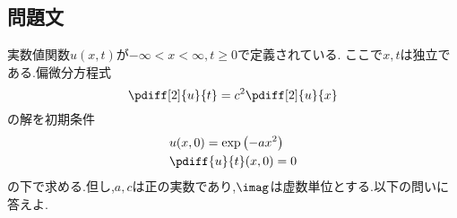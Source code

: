 \documentclass[dvipdfmx,titlepage, 11pt, a4paper]{jsarticle}%
\begin{document}
\newpage

\section{}%
\subsection{問題文}
実数値関数$u(x, t)$が$-\infty < x < \infty, t \geq 0$で定義されている.
ここで$x, t$は独立である.偏微分方程式
\begin{equation}
    \pdiff[2]{u}{t} = c^{2}\pdiff[2]{u}{x}\label{eq:subsec2:prom2}
\end{equation}
の解を初期条件
\begin{align}
    & u(x, 0) = \exp\left(-ax^{2}\right)\label{eq:subsec2:prom2_syoki1}\\
    & \pdiff{u}{t}(x, 0) = 0\label{eq:subsec2:prom2_syoki2}
\end{align}
の下で求める.但し,$a, c$は正の実数であり,$\imag$は虚数単位とする.以下の問いに答えよ.
\end{document}
